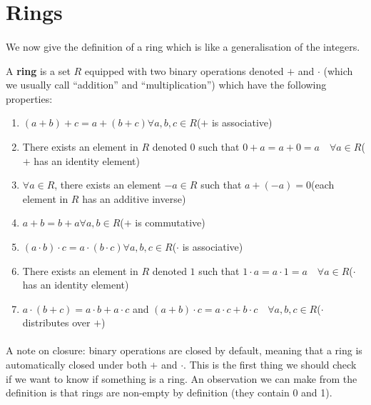 \documentclass[../abstract_algebra.tex]{subfiles}
\begin{document}
    \section{Rings}
        \paragraph{}
        We now give the definition of a ring which is like a generalisation of the integers.
        \begin{definition}
            A \textbf{ring} is a set $R$ equipped with two binary operations denoted $+$ and $\cdot$ (which we usually call ``addition'' and ``multiplication'') which have the following properties:
            \begin{enumerate}[label={\upshape(\roman*)}]
                \item $(a+b)+c=a+(b+c)$\quad$\forall a,b,c\in R$\quad($+$ is associative)
                \item There exists an element in $R$ denoted $0$ such that $0+a=a+0=a\quad\forall a\in R$\quad($+$ has an identity element)
                \item $\forall a\in R$, there exists an element $-a\in R$ such that $a+(-a)=0$\quad(each element in $R$ has an additive inverse)
                \item $a+b=b+a$\quad$\forall a,b\in R$\quad($+$ is commutative)
                \item $(a\cdot b)\cdot c=a\cdot(b\cdot c)$\quad$\forall a,b,c\in R$\quad($\cdot$ is associative)
                \item There exists an element in $R$ denoted $1$ such that $1\cdot a=a\cdot 1=a\quad\forall a\in R$\quad($\cdot$ has an identity element)
                \item $a\cdot(b+c)=a\cdot b+a\cdot c$ and $(a+b)\cdot c=a\cdot c +b\cdot c\quad\forall a,b,c\in R$\quad($\cdot$ distributes over $+$)
            \end{enumerate}
        \end{definition}

        \paragraph{}
        A note on closure: binary operations are closed by default, meaning that a ring is automatically closed under both $+$ and $\cdot$.
        This is the first thing we should check if we want to know if something is a ring.
        An observation we can make from the definition is that rings are non-empty by definition (they contain 0 and 1).
\end{document}
